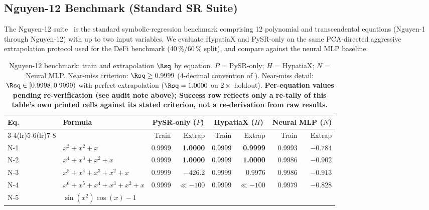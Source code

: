 \subsection{Nguyen-12 Benchmark (Standard SR Suite)}\label{subsec:nguyen12-benchmark-standard-sr-suite}
\label{sec:nguyen12}

The Nguyen-12 suite~\citep{uy2011semantically} is the standard symbolic-regression
benchmark comprising 12 polynomial and transcendental equations (Nguyen-1 through
Nguyen-12) with up to two input variables.  We evaluate HypatiaX and PySR-only on
the same PCA-directed aggressive extrapolation protocol used for the DeFi benchmark
(40\,\%/60\,\% split), and compare against the neural MLP baseline.

\begin{table}[h]
\centering
\caption{Nguyen-12 benchmark: train and extrapolation $\Rsq$ by equation.
$P$ = PySR-only; $H$ = HypatiaX; $N$ = Neural MLP.
Near-miss criterion: $\Rsq \ge 0.9999$ (4-decimal convention of
\citealt{uy2011semantically}).
Near-miss detail: $\Rsq\in[0.9998,0.9999)$ with perfect extrapolation
($\Rsq=1.0000$ on $2\times$ holdout).
\textbf{Per-equation values pending re-verification (see audit note above);
Success row reflects only a re-tally of this table's own printed cells
against its stated criterion, not a re-derivation from raw results.}}
\label{tab:nguyen12}
\begin{threeparttable}
\begin{tabular}{llrrrrrr}
\toprule
Eq. & Formula &
  \multicolumn{2}{c}{PySR-only ($P$)} &
  \multicolumn{2}{c}{HypatiaX ($H$)} &
  \multicolumn{2}{c}{Neural MLP ($N$)} \\
\cmidrule(lr){3-4}\cmidrule(lr){5-6}\cmidrule(lr){7-8}
 &  & Train & Extrap & Train & Extrap & Train & Extrap \\
\midrule
N-1  & $x^3 + x^2 + x$
  & 0.9999 & \textbf{1.0000}
  & 0.9999 & \textbf{0.9999}
  & 0.9993 & $-0.784$ \\
N-2  & $x^4 + x^3 + x^2 + x$
  & 0.9999 & \textbf{1.0000}
  & 0.9999 & \textbf{1.0000}
  & 0.9986 & $-0.902$ \\
N-3  & $x^5 + x^4 + x^3 + x^2 + x$
  & 0.9999 & \emph{$-426.2$}
  & 0.9999 & 0.9976
  & 0.9986 & $-0.913$ \\
N-4  & $x^6 + x^5 + x^4 + x^3 + x^2 + x$
  & 0.9999 & \emph{$\ll{-}100$}
  & 0.9999 & \emph{$\ll{-}100$}
  & 0.9979 & $-0.828$ \\
N-5  & $\sin(x^2)\cos(x)-1$

\end{tabular}
\end{threeparttable}
\end{table}
